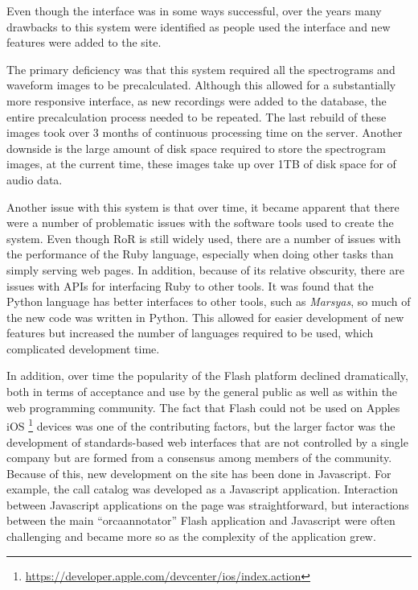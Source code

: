\documentclass[12pt,oneside]{book}
\begin{document}
Even though the interface was in some ways successful, over the years
many drawbacks to this system were identified as people used the
interface and new features were added to the site.

The primary deficiency was that this system required all the
spectrograms and waveform images to be precalculated.  Although this
allowed for a substantially more responsive interface, as new
recordings were added to the database, the entire precalculation
process needed to be repeated.  The last rebuild of these images took
over 3 months of continuous processing time on the server.  Another
downside is the large amount of disk space required to store the
spectrogram images, at the current time, these images take up over 1TB
of disk space for {\diskSpaceOrchive} of audio data.

Another issue with this system is that over time, it became apparent
that there were a number of problematic issues with the software tools
used to create the system.  Even though RoR is still widely used,
there are a number of issues with the performance of the Ruby
language, especially when doing other tasks than simply serving web
pages.  In addition, because of its relative obscurity, there are
issues with APIs for interfacing Ruby to other tools.  It was found
that the Python language has better interfaces to other tools, such as
\textit{Marsyas}, so much of the new code was written in Python.  This allowed
for easier development of new features but increased the number of
languages required to be used, which complicated development time.

In addition, over time the popularity of the Flash platform declined
dramatically, both in terms of acceptance and use by the general
public as well as within the web programming community.  The fact that
Flash could not be used on Apples
iOS \footnote{\url{https://developer.apple.com/devcenter/ios/index.action}}
devices was one of the contributing factors, but the larger factor was
the development of standards-based web interfaces that are not
controlled by a single company but are formed from a consensus among
members of the community.  Because of this, new development on the
site has been done in Javascript.  For example, the call catalog was
developed as a Javascript application.  Interaction between Javascript
applications on the page was straightforward, but interactions between
the main ``orcaannotator'' Flash application and Javascript were often
challenging and became more so as the complexity of the application
grew.
\end{document}
